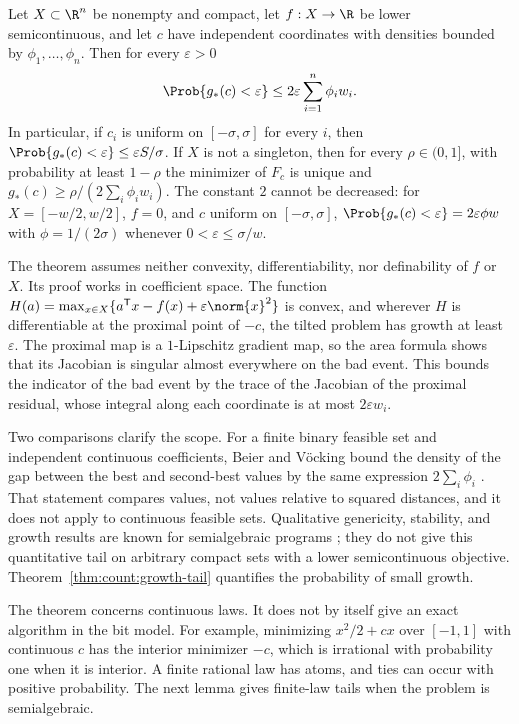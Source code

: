\begin{theorem}\label{thm:count:growth-tail}
Let $X\subset\R^n$ be nonempty and compact, let $f:X\to\R$ be lower
semicontinuous, and let $c$ have independent coordinates with densities
bounded by $\phi_1,\dots,\phi_n$. Then for every $\varepsilon>0$
\[
 \Prob\{g_*(c)<\varepsilon\}\le2\varepsilon\sum_{i=1}^n\phi_iw_i .
\]
In particular, if $c_i$ is uniform on $[-\sigma,\sigma]$ for every $i$, then
$\Prob\{g_*(c)<\varepsilon\}\le\varepsilon S/\sigma$. If $X$ is not a
singleton, then for every $\rho\in(0,1]$, with probability at least
$1-\rho$ the minimizer of $F_c$ is unique and
$g_*(c)\ge\rho/(2\sum_i\phi_iw_i)$. The constant $2$ cannot be decreased:
for $X=[-w/2,w/2]$, $f=0$, and $c$ uniform on $[-\sigma,\sigma]$,
$\Prob\{g_*(c)<\varepsilon\}=2\varepsilon\phi w$ with $\phi=1/(2\sigma)$
whenever $0<\varepsilon\le\sigma/w$.
\end{theorem}

The theorem assumes neither convexity, differentiability, nor definability of
$f$ or $X$. Its proof works in coefficient space. The function
$H(a)=\max_{x\in X}\{a^{\mathsf T} x-f(x)+\varepsilon\norm{x}^2\}$ is convex, and
wherever $H$ is differentiable at the proximal point of $-c$, the tilted
problem has growth at least $\varepsilon$. The proximal map is a
$1$-Lipschitz gradient map, so the area formula shows that its Jacobian is
singular almost everywhere on the bad event. This bounds the indicator of
the bad event by the trace of the Jacobian of the proximal residual, whose
integral along each coordinate is at most $2\varepsilon w_i$.

Two comparisons clarify the scope. For a finite binary feasible set and
independent continuous coefficients, Beier and V\"ocking bound the density of
the gap between the best and second-best values by the same expression
$2\sum_i\phi_i$ \cite{beier2006-typical-properties-of-winners-and}. That
statement compares values, not values relative to squared distances, and it
does not apply to continuous feasible sets. Qualitative genericity,
stability, and growth results are known for semialgebraic programs
\cite{lee2017-generic-properties-for-semialgebraic-programs}; they do not
give this quantitative tail on arbitrary compact sets with a lower
semicontinuous objective. Theorem~\ref{thm:count:growth-tail} quantifies the
probability of small growth.

The theorem concerns continuous laws. It does not by itself give an exact
algorithm in the bit model. For example, minimizing $x^2/2+cx$ over $[-1,1]$
with continuous $c$ has the interior minimizer $-c$, which is irrational with
probability one when it is interior. A finite rational law has atoms, and
ties can occur with positive probability. The next lemma gives finite-law
tails when the problem is semialgebraic.

